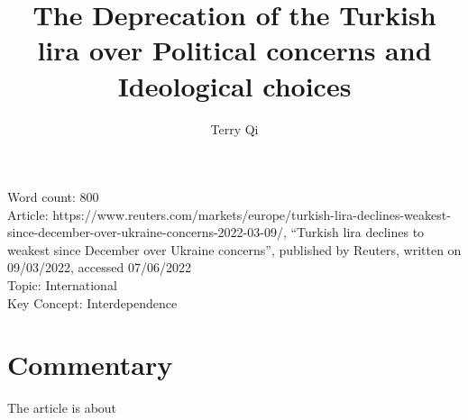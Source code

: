 \documentclass[a4paper,12pt]{article}
\title{The Deprecation of the Turkish lira over Political concerns and Ideological choices}
\author{Terry Qi}
\begin{document}
\maketitle
Word count: 800\\
Article: https://www.reuters.com/markets/europe/turkish-lira-declines-weakest-since-december-over-ukraine-concerns-2022-03-09/, ``Turkish lira declines to weakest since December over Ukraine concerns'', published by Reuters, written on 09/03/2022, accessed 07/06/2022\\
Topic: International\\
Key Concept: Interdependence

\newpage
\section*{Commentary}

The article is about
\end{document}
